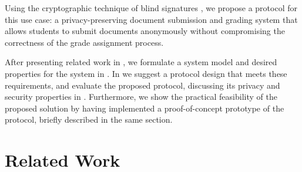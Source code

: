Using the cryptographic technique of blind signatures
\cite{chaum_blind_1982}, we propose a protocol for this use case: a
privacy-preserving document submission and grading system that allows
students to submit documents anonymously without compromising the
correctness of the grade assignment process. 


After presenting related work in , we formulate a
system model and desired properties for the system in
. In
 we suggest a protocol design that meets
these requirements, and evaluate the proposed protocol, discussing its
privacy and security properties in . Furthermore,
we show the practical feasibility of the proposed solution by having
implemented a proof-of-concept prototype of the protocol, briefly
described in the same section.
    
%
%
%
%
%


\section{Related Work}
    \label{section:document-submission-system:related-work}

